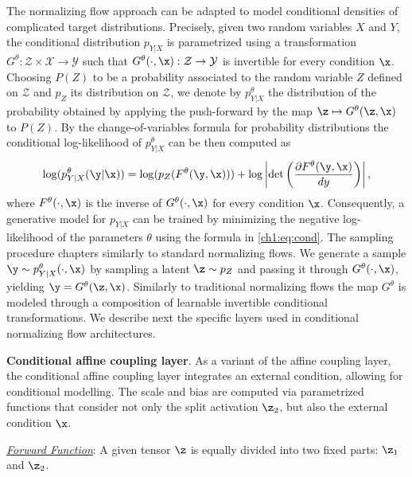 The normalizing flow approach can be adapted to model conditional densities of complicated target distributions. Precisely, given two random variables $X$ and $Y$, the conditional distribution $p_{Y|X}$ is parametrized using a transformation $G^\theta : \mathcal{Z} \times \mathcal{X} \rightarrow \mathcal{Y}$ such that $G^\theta(\cdot, \x) : \mathcal{Z} \rightarrow \mathcal{Y}$ is invertible for every condition $\x$. Choosing $P(Z)$ to be a probability associated to the random variable $Z$ defined on $\mathcal{Z}$ and $p_Z$ its distribution on $\mathcal{Z}$, we denote by $p^\theta_{Y|X}$ the distribution of the probability obtained by applying the push-forward by the map $ \z \mapsto G^\theta(\z, \x)$ to $P(Z)$. By the change-of-variables formula for probability distributions the conditional log-likelihood of $p^\theta_{Y|X}$ can be then computed as 
\begin{align}\label{ch1:eq:cond}
\log(p^\theta_{Y|X}(\y|\x)) = \log(p_{Z}(F^\theta(\y,\x)))   +  \log\left| \det \left(\frac{\partial F^{\theta}(\y,\x)}{dy} \right)\right|,
\end{align}
where $F^\theta(\cdot, \x)$ is the inverse of $G^\theta(\cdot, \x)$ for every condition $\x$.
Consequently, a generative model for $p_{Y|X}$ can be trained by minimizing the negative log-likelihood of the parameters $\theta$ using the formula in \eqref{ch1:eq:cond}. The sampling procedure chapters similarly to standard normalizing flows. We generate a sample $\y \sim p^\theta_{Y|X}(\cdot, \x)$ by sampling a latent $\z\sim p_Z$ and passing it through $G^\theta(\cdot, \x)$, yielding $\y=G^\theta(\z, \x)$. Similarly to traditional normalizing flows the map $G^\theta$ is modeled through a composition of learnable invertible conditional transformations. We describe next the specific layers used in conditional normalizing flow architectures.

\medskip

\textbf{Conditional affine coupling layer}. As a variant of the affine coupling layer, the conditional affine coupling layer integrates an external condition, allowing for conditional modelling. The scale and bias are computed via parametrized functions that consider not only the split activation \(\z_2\), but also the external condition \(\x\). 

\smallskip



\textit{\underline{Forward Function}}:
A given tensor \(\z\) is equally divided into two fixed parts: \(\z_1\) and \(\z_2\). 


